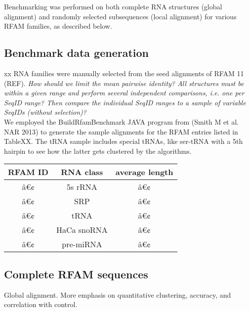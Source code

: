 \documentclass[a4paper,twoside]{article}
\begin{document}
Benchmarking was performed on both complete RNA structures (global alignment) and randomly selected subsequences (local alignment) for various RFAM families, as described below. \\


\subsection{Benchmark data generation} 

xx RNA families were manually selected from the seed alignments of RFAM 11 (REF). \textit{How should we limit the mean pairwise identity? All structures must be within a given range and perform several independent comparisons, i.e. one per SeqID range? Then compare the individual SeqID ranges to a sample of variable SeqIDs (without selection)?}\\

We employed the BuildRfamBenchmark JAVA program from (Smith M et al. NAR 2013) to generate the sample alignments for the RFAM entries listed in TableXX. The tRNA sample includes special tRNAs, like ser-tRNA with a 5th hairpin to see how the latter gets clustered by the algorithms. \\

\begin{tabular}{|c|c|c|}
\hline 
\textbf{RFAM ID} & \textbf{RNA class} & \textbf{average length} \\ 
\hline 
â€¢ & 5s rRNA & â€¢ \\ 
â€¢ & SRP & â€¢ \\ 
â€¢ & tRNA & â€¢ \\ 
â€¢ & HaCa snoRNA & â€¢ \\ 
â€¢ & pre-miRNA & â€¢ \\ 
\hline 
\end{tabular} 


\subsection{Complete RFAM sequences}

Global alignment. More emphasis on quantitative clustering, accuracy, and correlation with control. 
\end{document}

